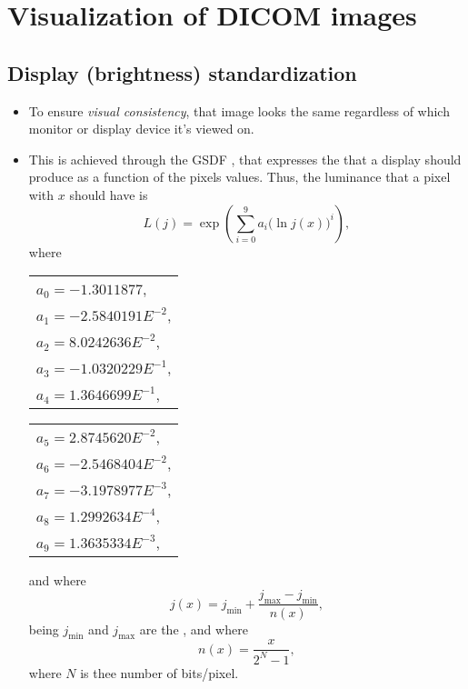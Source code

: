 \chapter{Visualization of \gls{DICOM} images}

\section{Display (brightness) standardization}
\begin{itemize}
\item To ensure \emph{visual consistency}, that image looks the same
  regardless of which monitor or display device it's viewed on.
\item This is achieved through the \gls{GSDF} \cite{DICOM_GSDF}, that
  expresses the  that a display
  should produce as a function of the pixels values. Thus, the
  luminance that a pixel with  $x$ should have is
  \begin{equation}
    L(j) = \exp\left(\sum_{i=0}^{9}a_i\big(\ln j(x)\big)^i\right),
  \end{equation}
  where
  \begin{center}
  \begin{tabular}{l}
    $a_0 = -1.3011877$, \\
    $a_1 = -2.5840191E^{-2}$, \\
    $a_2 = 8.0242636E^{-2}$, \\
    $a_3 = -1.0320229E^{-1}$, \\
    $a_4 = 1.3646699E^{-1}$, \\
  \end{tabular}
  \begin{tabular}{l}
    $a_5 = 2.8745620E^{-2}$, \\
    $a_6 = -2.5468404E^{-2}$,\\
    $a_7 = -3.1978977E^{-3}$, \\
    $a_8 = 1.2992634E^{-4}$, \\
    $a_9 = 1.3635334E^{-3}$,
  \end{tabular}
  \end{center}
  and where
  \begin{equation}
    j(x) = j_{\text{min}} + \frac{j_{\text{max}} - j_{\text{min}}}{n(x)},
  \end{equation}
  being $j_{\text{min}}$ and $j_{\text{max}}$ are the , and where
  \begin{equation}
    n(x) = \frac{x}{2^N-1},
  \end{equation}
  where $N$ is thee number of bits/pixel.
\end{itemize}

